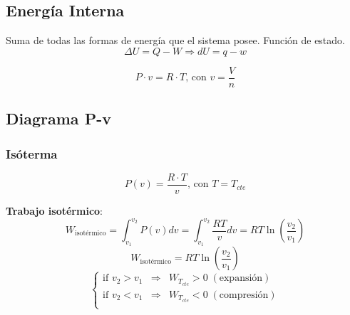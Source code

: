     \subsection{Energía Interna}
    Suma de todas las formas de energía que el sistema posee. Función de estado.
    \begin{equation}
    \label{def_energia}
        \Delta U = Q - W \Rightarrow dU = q - w
    \end{equation}
    \begin{quote}
        \textit{}
    \end{quote}
    \begin{equation}
    \label{presion_ideal}
        P \cdot v = R \cdot T \text{, con }v=\frac{V}{n}
    \end{equation}

    \newpage
    \subsection{Diagrama P-v}
    
        \subsubsection{Isóterma}
        \begin{equation}
            P(v) = \frac{R \cdot T}{v} \text{, con } T = T_{cte}
        \end{equation}
        
        \textbf{Trabajo isotérmico}:
        \[W_{\text{isotérmico}}=\int_{v_{1}}^{v_{2}} P(v)dv=\int_{v_{1}}^{v_{2}} \frac{RT}{v}dv=RT\ln \left ( \frac{v_{2}}{v_{1}} \right )\]
        \begin{equation}
            W_{\text{isotérmico}}=RT\ln \left ( \frac{v_{2}}{v_{1}} \right )
        \end{equation}
        \begin{equation}
            \left\{\begin{matrix}
            \text{if } v_{2} > v_{1} & \Rightarrow  & W_{T_{cte}} > 0\; (\text{expansión})\\ 
            \text{if } v_{2} < v_{1} & \Rightarrow  & W_{T_{cte}} < 0\; (\text{compresión})\\ 
        \end{matrix}\right.
        \end{equation}

